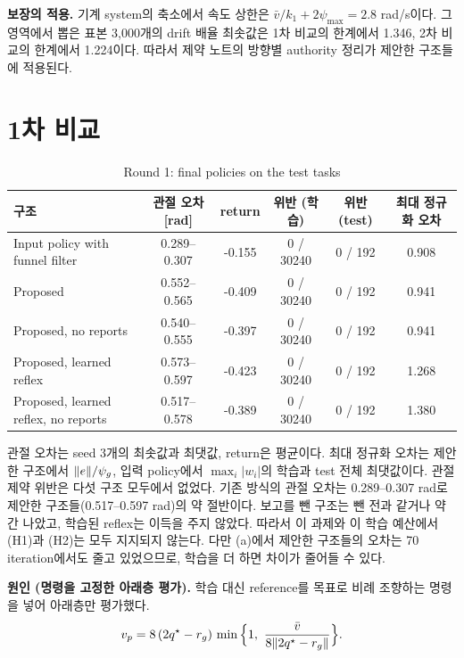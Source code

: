 \documentclass[11pt]{article}\usepackage[margin=1in]{geometry}\usepackage{amsmath,amssymb,amsthm,mathtools}\usepackage{graphicx}\graphicspath{{figures/}{../figures/}{figs/}{./}}\usepackage{enumitem}\usepackage{hyperref}\usepackage{cleveref}\usepackage{tikz}\usetikzlibrary{arrows.meta,positioning,calc,shapes.geometric}\usepackage{float}\usepackage[most]{tcolorbox}\usepackage{kotex}\usepackage{booktabs}\emergencystretch=1.6em\tolerance=2000 \crefname{assumption}{Assumption}{Assumptions}\Crefname{assumption}{Assumption}{Assumptions}\crefname{definition}{Definition}{Definitions}\Crefname{definition}{Definition}{Definitions}\crefname{proposition}{Proposition}{Propositions}\Crefname{proposition}{Proposition}{Propositions}\crefname{fact}{Fact}{Facts}\Crefname{fact}{Fact}{Facts} \newtheorem{assumption}{Assumption}\newtheorem{definition}{Definition}\newtheorem{lemma}{Lemma}\newtheorem{proposition}{Proposition}\newtheorem{theorem}{Theorem}\newtheorem{corollary}{Corollary}\newtheorem{fact}{Fact}\theoremstyle{remark}\newtheorem{remark}{Remark} \newcommand{\R}{\mathbb{R}}\newcommand{\U}{\mathcal U}
\begin{document}
\textbf{보장의 적용.} 기계 system의 축소에서 속도 상한은 $\bar v/k_1+2\psi_{\max}=2.8$ rad/s이다. 그 영역에서 뽑은 표본 3,000개의 drift 배율 최솟값은 1차 비교의 한계에서 1.346, 2차 비교의 한계에서 1.224이다. 따라서 제약 노트의 방향별 authority 정리가 제안한 구조들에 적용된다.

\section{1차 비교}
\label{sec:round1}

\begin{table}[H]
\centering\footnotesize\setlength{\tabcolsep}{4pt}
\caption{Round 1: final policies on the test tasks}
\label{tab:r1}
\begin{tabular}{p{4.3cm}ccccc}
\toprule
구조 & 관절 오차 [rad] & return & 위반 (학습) & 위반 (test) & 최대 정규화 오차 \\
\midrule
Input policy with funnel filter & 0.289--0.307 & -0.155 & 0 / 30240 & 0 / 192 & 0.908 \\
Proposed & 0.552--0.565 & -0.409 & 0 / 30240 & 0 / 192 & 0.941 \\
Proposed, no reports & 0.540--0.555 & -0.397 & 0 / 30240 & 0 / 192 & 0.941 \\
Proposed, learned reflex & 0.573--0.597 & -0.423 & 0 / 30240 & 0 / 192 & 1.268 \\
Proposed, learned reflex, no reports & 0.517--0.578 & -0.389 & 0 / 30240 & 0 / 192 & 1.380 \\
\bottomrule
\end{tabular}
\end{table}

관절 오차는 seed 3개의 최솟값과 최댓값, return은 평균이다. 최대 정규화 오차는 제안한 구조에서 $\lVert e\rVert/\psi_g$, 입력 policy에서 $\max_i|w_i|$의 학습과 test 전체 최댓값이다. 관절 제약 위반은 다섯 구조 모두에서 없었다. 기존 방식의 관절 오차는 0.289--0.307 rad로 제안한 구조들(0.517--0.597 rad)의 약 절반이다. 보고를 뺀 구조는 뺀 전과 같거나 약간 나았고, 학습된 reflex는 이득을 주지 않았다. 따라서 이 과제와 이 학습 예산에서 (H1)과 (H2)는 모두 지지되지 않는다. 다만 (a)에서 제안한 구조들의 오차는 70 iteration에서도 줄고 있었으므로, 학습을 더 하면 차이가 줄어들 수 있다.

\textbf{원인 (명령을 고정한 아래층 평가).} 학습 대신 reference를 목표로 비례 조향하는 명령을 넣어 아래층만 평가했다.
\[
v_p=8\,(2q^\star-r_g)\,\min\Big\{1,\ \frac{\bar v}{8\lVert 2q^\star-r_g\rVert}\Big\}.
\]
\end{document}
